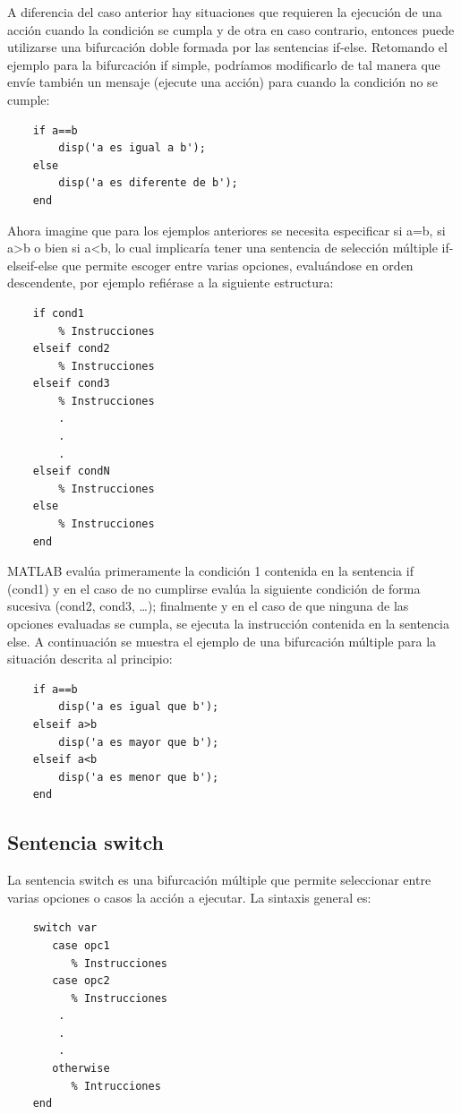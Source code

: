A  diferencia del caso anterior hay situaciones que requieren la ejecución de una acción 
cuando la condición se cumpla y de otra en caso contrario, entonces puede utilizarse 
una bifurcación doble formada por las sentencias  if-else. Retomando el ejemplo para 
la bifurcación if simple, podríamos modificarlo de tal manera que envíe también un 
mensaje (ejecute una acción) para cuando la condición no se cumple:

\begin{verbatim}
	if a==b
	    disp('a es igual a b');
	else
	    disp('a es diferente de b');
	end
\end{verbatim}

Ahora imagine que para los ejemplos anteriores  se necesita especificar si  a=b, si a>b 
o bien si a<b, lo cual implicaría tener una sentencia de selección múltiple 
if-elseif-else que permite escoger entre varias opciones, evaluándose en orden 
descendente, por ejemplo refiérase a la siguiente estructura:

\begin{verbatim}
	if cond1
	    % Instrucciones
	elseif cond2 
	    % Instrucciones
	elseif cond3
	    % Instrucciones
	    .
	    .
	    .
	elseif condN
	    % Instrucciones
	else
	    % Instrucciones
	end
\end{verbatim}

MATLAB evalúa primeramente la condición 1 contenida en la sentencia if (cond1) y en 
el caso de no cumplirse evalúa la siguiente condición de forma sucesiva (cond2, cond3, …); 
finalmente y en el caso de que ninguna de las opciones evaluadas se cumpla, se ejecuta 
la instrucción contenida en la sentencia else. A continuación se muestra el ejemplo de 
una bifurcación múltiple para la situación descrita al principio:

\begin{verbatim}
	if a==b
	    disp('a es igual que b');
	elseif a>b
	    disp('a es mayor que b');
	elseif a<b
	    disp('a es menor que b');
	end
\end{verbatim}

\subsection{Sentencia switch}

La sentencia switch es una bifurcación múltiple que permite seleccionar entre varias 
opciones o casos la acción a ejecutar. La sintaxis general es:

\begin{verbatim}
	switch var
	   case opc1
	      % Instrucciones
	   case opc2
	      % Instrucciones
	    .
	    .
	    .
	   otherwise
	      % Intrucciones
	end
\end{verbatim}

